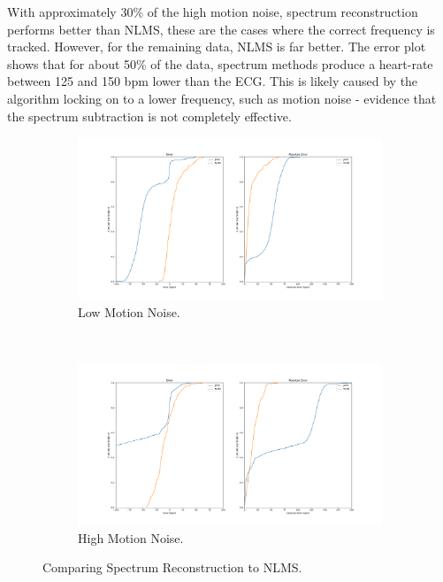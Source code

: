 \documentclass[12pt,a4paper,twoside,openright]{report}
\begin{document}
With approximately 30\% of the high motion noise, spectrum reconstruction
performs better than NLMS, these are the cases where the correct frequency is
tracked. However, for the remaining data, NLMS is far better. The error plot
shows that for about 50\% of the data, spectrum methods produce a heart-rate between
125 and 150 bpm lower than the ECG. This is likely caused by the algorithm
locking on to a lower frequency, such as motion noise - evidence that the
spectrum subtraction is not completely effective.

\begin{figure}[h]
\centering
\begin{subfigure}{.6\textwidth}
  \centering
  \includegraphics[width=\linewidth]{figs/joss_nlms_low.png}
  \caption{Low Motion Noise.}
  \label{fig:joss_nlms_low}
\end{subfigure}
\\
\begin{subfigure}{.6\textwidth}
  \centering
  \includegraphics[width=\linewidth]{figs/joss_nlms_medium.png}
  \caption{High Motion Noise.}
  \label{fig:joss_nlms_medium}
\end{subfigure}
\caption{Comparing Spectrum Reconstruction to NLMS.}
\label{fig:joss_nlms}
\end{figure}
\end{document}
